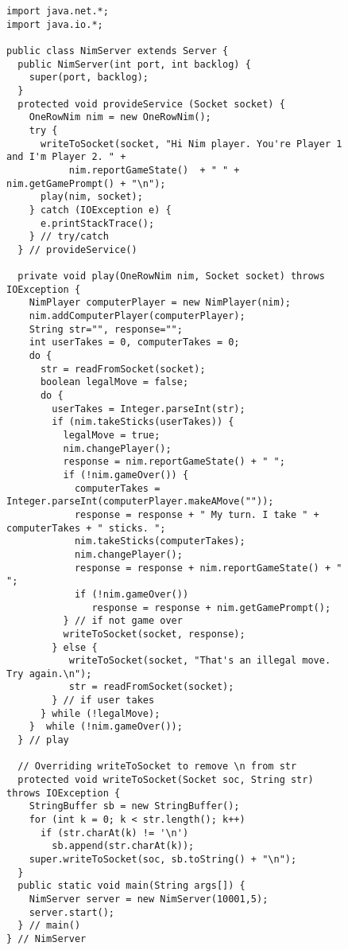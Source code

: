 \clearpage
\begin{figure}[h!]
\jjjprogstart
\begin{jjjlisting}[29pc]
\begin{lstlisting}[basicstyle=\scriptsize]
import java.net.*;
import java.io.*;

public class NimServer extends Server {
  public NimServer(int port, int backlog) {
    super(port, backlog);
  }
  protected void provideService (Socket socket) {
    OneRowNim nim = new OneRowNim();
    try {
      writeToSocket(socket, "Hi Nim player. You're Player 1 and I'm Player 2. " +
           nim.reportGameState()  + " " + nim.getGamePrompt() + "\n");
      play(nim, socket);
    } catch (IOException e) {
      e.printStackTrace();
    } // try/catch
  } // provideService()

  private void play(OneRowNim nim, Socket socket) throws IOException {
    NimPlayer computerPlayer = new NimPlayer(nim);
    nim.addComputerPlayer(computerPlayer);
    String str="", response="";
    int userTakes = 0, computerTakes = 0;
    do {     
      str = readFromSocket(socket);
      boolean legalMove = false;
      do {
        userTakes = Integer.parseInt(str);
        if (nim.takeSticks(userTakes)) {
          legalMove = true;
          nim.changePlayer();
          response = nim.reportGameState() + " ";
          if (!nim.gameOver()) {
            computerTakes = Integer.parseInt(computerPlayer.makeAMove(""));    
            response = response + " My turn. I take " + computerTakes + " sticks. ";
            nim.takeSticks(computerTakes);
            nim.changePlayer();
            response = response + nim.reportGameState() + " ";
            if (!nim.gameOver())
               response = response + nim.getGamePrompt();
          } // if not game over
          writeToSocket(socket, response);
        } else {
           writeToSocket(socket, "That's an illegal move. Try again.\n");
           str = readFromSocket(socket);
        } // if user takes
      } while (!legalMove);
    }  while (!nim.gameOver());
  } // play

  // Overriding writeToSocket to remove \n from str
  protected void writeToSocket(Socket soc, String str) throws IOException {
    StringBuffer sb = new StringBuffer();
    for (int k = 0; k < str.length(); k++)
      if (str.charAt(k) != '\n')
        sb.append(str.charAt(k));
    super.writeToSocket(soc, sb.toString() + "\n");
  }
  public static void main(String args[]) {
    NimServer server = new NimServer(10001,5);
    server.start();
  } // main()
} // NimServer
\end{lstlisting}
\end{jjjlisting}
\end{figure}

